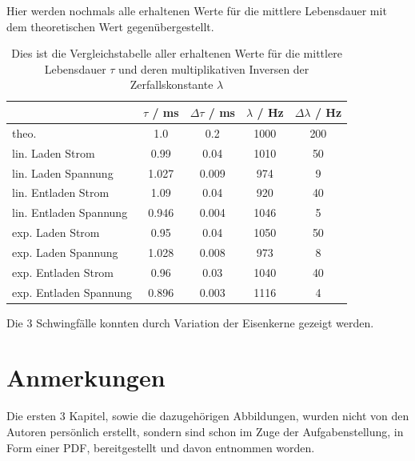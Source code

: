 \documentclass[11pt,ngerman]{scrartcl}
\begin{document}
Hier werden nochmals alle erhaltenen Werte für die mittlere Lebensdauer mit
dem theoretischen Wert gegenübergestellt.

\begin{table}[H]
	\caption{Dies ist die Vergleichstabelle aller erhaltenen Werte für die mittlere
		Lebensdauer $\tau$ und deren multiplikativen Inversen der Zerfallskonstante $\lambda$}
	\label{tab:ergebniszerfallskonstante}
	\begin{center}
		\begin{tabular}[c]{l|c|c|c|c}
			\hline
			\multicolumn{1}{c|}{\textbf{}}                &
			\multicolumn{1}{c|}{$\tau$ / \si{\ms}}        &
			\multicolumn{1}{c|}{$\Delta \tau$ / \si{\ms}} &
			\multicolumn{1}{c|}{$\lambda$ / \si{\Hz}}     &
			\multicolumn{1}{c}{$\Delta \lambda$ / \si{\Hz}}                            \\
			\hline
			theo.                                         & 1.0   & 0.2   & 1000 & 200 \\
			lin. Laden Strom                              & 0.99  & 0.04  & 1010 & 50  \\
			lin. Laden Spannung                           & 1.027 & 0.009 & 974  & 9   \\
			lin. Entladen Strom                           & 1.09  & 0.04  & 920  & 40  \\
			lin. Entladen Spannung                        & 0.946 & 0.004 & 1046 & 5   \\
			exp. Laden Strom                              & 0.95  & 0.04  & 1050 & 50  \\
			exp. Laden Spannung                           & 1.028 & 0.008 & 973  & 8   \\
			exp. Entladen Strom                           & 0.96  & 0.03  & 1040 & 40  \\
			exp. Entladen Spannung                        & 0.896 & 0.003 & 1116 & 4   \\
			\hline
		\end{tabular}
	\end{center}
\end{table}

\vspace{2mm}

Die 3 Schwingfälle konnten durch Variation der Eisenkerne gezeigt werden.

\section{Anmerkungen}

Die ersten 3 Kapitel, sowie die dazugehörigen Abbildungen, wurden nicht von den
Autoren persönlich erstellt, sondern sind schon im Zuge der Aufgabenstellung,
in Form einer PDF, bereitgestellt und davon entnommen worden. \cite{vorlageoszi}


\newpage

%
%
\printbibliography
\listoffigures
\listoftables
\end{document}
